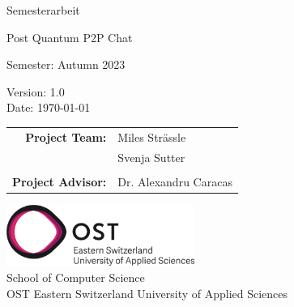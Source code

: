 \begin{titlepage}

    \begin{center}
        \vspace{1 cm}

        {\Large Semesterarbeit} \\

        \vspace{0.5cm}

        {\Huge Post Quantum P2P Chat}

        \vspace{0.5cm}

        Semester: Autumn 2023

        \vspace{1 cm}

        \vspace{1 cm}

        Version: 1.0 \\
        Date: \today \\
        \vspace{1 cm}

        \begin{tabular}{rl}
            \textbf{Project Team:}    & Miles Strässle \\
                                      & Svenja Sutter \\
                                      &                    \\
            \textbf{Project Advisor:} & Dr. Alexandru Caracas
        \end{tabular}

        \vfill

        \includegraphics[height=2cm]{resources/ost-logo.png}\\

        \vspace{1cm}
        School of Computer Science\\
        OST Eastern Switzerland University of Applied Sciences

    \end{center}

\end{titlepage}
